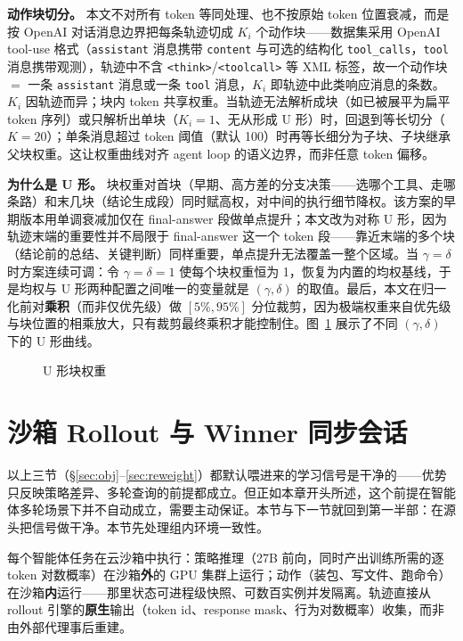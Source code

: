 \textbf{动作块切分。} 本文不对所有 token 等同处理、也不按原始 token 位置衰减，而是按 OpenAI 对话消息边界把每条轨迹切成 $K_i$ 个动作块——数据集采用 OpenAI tool-use 格式（\texttt{assistant} 消息携带 \texttt{content} 与可选的结构化 \texttt{tool\_calls}，\texttt{tool} 消息携带观测），轨迹中不含 \texttt{<think>}/\texttt{<toolcall>} 等 XML 标签，故一个动作块 $=$ 一条 \texttt{assistant} 消息或一条 \texttt{tool} 消息，$K_i$ 即轨迹中此类响应消息的条数。$K_i$ 因轨迹而异；块内 token 共享权重。当轨迹无法解析成块（如已被展平为扁平 token 序列）或只解析出单块（$K_i=1$、无从形成 U 形）时，回退到等长切分（$K=20$）；单条消息超过 token 阈值（默认 100）时再等长细分为子块、子块继承父块权重。这让权重曲线对齐 agent loop 的语义边界，而非任意 token 偏移。

\textbf{为什么是 U 形。} 块权重对首块（早期、高方差的分支决策——选哪个工具、走哪条路）和末几块（结论生成段）同时赋高权，对中间的执行细节降权。该方案的早期版本用单调衰减加仅在 final-answer 段做单点提升；本文改为对称 U 形，因为轨迹末端的重要性并不局限于 final-answer 这一个 token 段——靠近末端的多个块（结论前的总结、关键判断）同样重要，单点提升无法覆盖一整个区域。当 $\gamma=\delta$ 时方案连续可调：令 $\gamma=\delta=1$ 使每个块权重恒为 1，恢复为内置的均权基线，于是均权与 U 形两种配置之间唯一的变量就是 $(\gamma,\delta)$ 的取值。最后，本文在归一化前对\textbf{乘积}（而非仅优先级）做 $[5\%,95\%]$ 分位裁剪，因为极端权重来自优先级与块位置的相乘放大，只有裁剪最终乘积才能控制住。图~\ref{fig:ushape} 展示了不同 $(\gamma,\delta)$ 下的 U 形曲线。

\begin{figure}[htbp]
\centering
{}
\caption{U 形块权重}
\label{fig:ushape}
\end{figure}

\section{沙箱 Rollout 与 Winner 同步会话}
\label{sec:rollout}

以上三节（\S\ref{sec:obj}--\ref{sec:reweight}）都默认喂进来的学习信号是干净的——优势只反映策略差异、多轮查询的前提都成立。但正如本章开头所述，这个前提在智能体多轮场景下并不自动成立，需要主动保证。本节与下一节就回到第一半部：在源头把信号做干净。本节先处理组内环境一致性。

每个智能体任务在云沙箱中执行：策略推理（27B 前向，同时产出训练所需的逐 token 对数概率）在沙箱\textbf{外}的 GPU 集群上运行；动作（装包、写文件、跑命令）在沙箱\textbf{内}运行——那里状态可进程级快照、可数百实例并发隔离。轨迹直接从 rollout 引擎的\textbf{原生}输出（token id、response mask、行为对数概率）收集，而非由外部代理事后重建。

